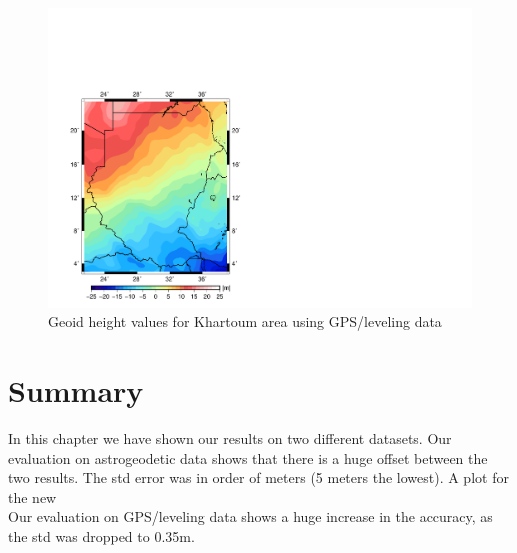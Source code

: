             \begin{figure}[t]
               	\caption{Geoid height values for Khartoum area using GPS/leveling data}
               	\label{new_datum}
               	\includegraphics{Figures/ITU_GGC16.pdf}
               	\centering
            \end{figure}
    
 \section{Summary}
 
 In this chapter we have shown our results on two different datasets. Our evaluation on astrogeodetic data shows that there is a huge offset between the two results. The std error was in order of meters (5 meters the lowest). A plot for the new 
 \\
  Our evaluation on GPS/leveling data shows a huge increase in the accuracy, as the std was dropped to 0.35m.